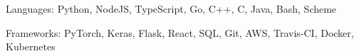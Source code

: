 


\begin{cvskills}


\cvskill
{Languages:} %
{Python, NodeJS, TypeScript, Go, C++, C, Java, Bash, Scheme} %


\cvskill
{Frameworks:} %
{PyTorch, Keras, Flask, React, SQL, Git, AWS, Travis-CI, Docker, Kubernetes}


\end{cvskills}